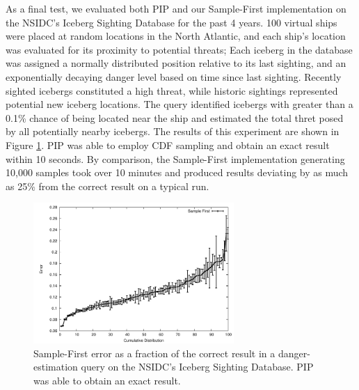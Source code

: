 As a final test, we evaluated both PIP and our Sample-First implementation on the NSIDC's Iceberg Sighting Database\cite{iceberg} for the past 4 years.  100 virtual ships were placed at random locations in the North Atlantic, and each ship's location was evaluated for its proximity to potential threats; Each iceberg in the database was assigned a normally distributed position relative to its last sighting, and an exponentially decaying danger level based on time since last sighting.  Recently sighted icebergs constituted a high threat, while historic sightings represented potential new iceberg locations.  The query identified icebergs with greater than a 0.1\% chance of being located near the ship and estimated the total thret posed by all potentially nearby icebergs.  The results of this experiment are shown in Figure \ref{fig:iceberg}.  PIP was able to employ CDF sampling and obtain an exact result within 10 seconds.  By comparison, the Sample-First implementation generating 10,000 samples took over 10 minutes and produced results deviating by as much as 25\% from the correct result on a typical run.

\begin{figure}
\begin{center}
%
\includegraphics[width=3in]{graphics/iceberg_danger.pdf}
\caption{Sample-First error as a fraction of the correct result in a danger-estimation query on the NSIDC's Iceberg Sighting Database.  PIP was able to obtain an exact result.}
\end{center}
\label{fig:iceberg}
\vspace*{-0.3in}
\end{figure}

